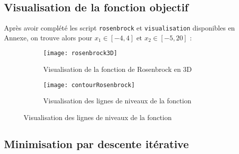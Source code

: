 \documentclass[12pt,a4paper,titlepage]{article}
\begin{document}
\subsection{Visualisation de la fonction objectif}

Après avoir complété les script \texttt{rosenbrock} et \texttt{visualisation} disponibles en Annexe, on trouve alors pour $x_1 \in \left[ -4, 4 \right] \mbox{ et } x_2 \in \left[ -5, 20 \right]$ :
\newline
\begin{figure}[h]
    \centering
    \begin{subfigure}[h]{0.49\textwidth}
        \centering
        \texttt{[image: rosenbrock3D]}
        \caption{Visualisation de la fonction de Rosenbrock en 3D}
    \end{subfigure}
    \begin{subfigure}[h]{0.49\textwidth}
        \centering
        \texttt{[image: contourRosenbrock]}
        \caption{Visualisation des lignes de niveaux de la fonction}
    \end{subfigure}
\end{figure}

\subsection{Minimisation par descente itérative}
\end{document}
